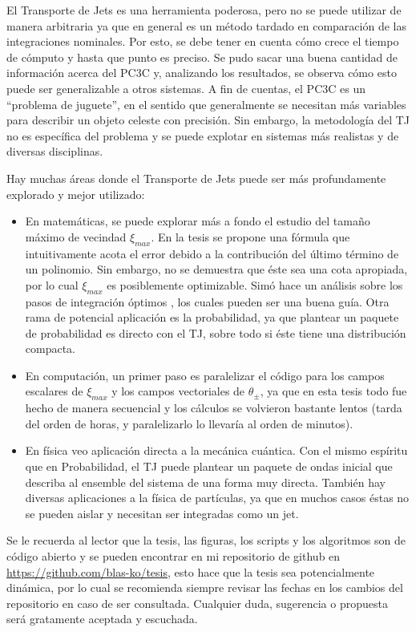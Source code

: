 El Transporte de Jets es una herramienta poderosa, pero no se puede utilizar de manera arbitraria ya que en general es un método tardado en comparación de las integraciones nominales. Por esto, se debe tener en cuenta cómo crece el tiempo de cómputo y hasta que punto es preciso. Se pudo sacar una buena cantidad de información acerca del PC3C y, analizando los resultados, se observa cómo esto puede ser generalizable a otros sistemas. A fin de cuentas, el PC3C es un ``problema de juguete'', en el sentido que generalmente se necesitan más variables para describir un objeto celeste con precisión. Sin embargo, la metodología del TJ no es específica del problema y se puede explotar en sistemas más realistas y de diversas disciplinas. 

Hay muchas áreas donde el Transporte de Jets puede ser más profundamente explorado y mejor utilizado: 
\begin{itemize}
\item En matemáticas, se puede explorar más a fondo el estudio del tamaño máximo de vecindad $\xi_{max}$. En la tesis se propone una fórmula que intuitivamente acota el error debido a la contribución del último término de un polinomio. Sin embargo, no se demuestra que éste sea una cota apropiada, por lo cual $\xi_{max}$ es posiblemente optimizable. Simó hace un análisis sobre los pasos de integración óptimos \cite[Capítulo~15]{Simo2001}, los cuales pueden ser una buena guía. Otra rama de potencial aplicación es la probabilidad, ya que plantear un paquete de probabilidad es directo con el TJ, sobre todo si éste tiene una distribución compacta.

\item En computación, un primer paso es paralelizar el código para los campos escalares de $\xi_{max}$ y los campos vectoriales de $\theta_{\pm}$, ya que en esta tesis todo fue hecho de manera secuencial y los cálculos se volvieron bastante lentos (tarda del orden de horas, y paralelizarlo lo llevaría al orden de minutos). 

\item En física veo aplicación directa a la mecánica cuántica. Con el mismo espíritu que en Probabilidad, el TJ puede plantear un paquete de ondas inicial que describa al ensemble del sistema de una forma muy directa. También hay diversas aplicaciones a la física de partículas, ya que en muchos casos éstas no se pueden aislar y necesitan ser integradas como un jet.
\end{itemize}

Se le recuerda al lector que la tesis, las figuras, los scripts y los algoritmos son de código abierto y se pueden encontrar en mi repositorio de github en \href{https://github.com/blas-ko/tesis}{https://github.com/blas-ko/tesis}, esto hace que la tesis sea potencialmente dinámica, por lo cual se recomienda siempre revisar las fechas en los cambios del repositorio en caso de ser consultada. Cualquier duda, sugerencia o propuesta será gratamente aceptada y escuchada.

